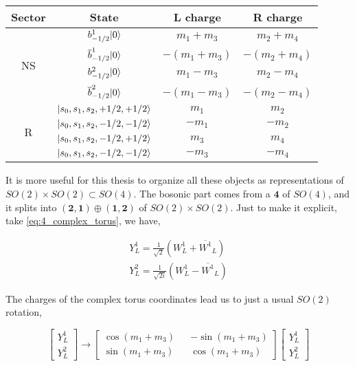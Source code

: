 \begin{table}[h]
    \centering
    \begin{tabular}{cccc}
    Sector              & State                          & L charge     & R charge     \\ \hline
    \multirow{4}{*}{NS} & $b_{-1/2}^1\lvert0\rangle$            & $m_1+m_3$    & $m_2+m_4$    \\
                        & $\overline{b}_{-1/2}^1\lvert0\rangle$ & $-(m_1+m_3)$ & $-(m_2+m_4)$ \\
                        & $b_{-1/2}^2\lvert0\rangle$            & $m_1-m_3$    & $m_2-m_4$    \\
                        & $\overline{b}_{-1/2}^2\lvert0\rangle$ & $-(m_1-m_3)$ & $-(m_2-m_4)$ \\ \hline
    \multirow{4}{*}{R}  & $\lvert s_0,s_1,s_2,+1/2,+1/2\rangle$  & $m_1$        & $m_2$        \\
                        & $\lvert s_0,s_1,s_2,-1/2,-1/2\rangle$  & $-m_1$       & $-m_2$       \\
                        & $\lvert s_0,s_1,s_2,-1/2,+1/2\rangle$  & $m_3$        & $m_4$        \\
                        & $\lvert s_0,s_1,s_2,-1/2,-1/2\rangle$  & $-m_3$       & $-m_4$      
\end{tabular}
\end{table}

It is more useful for this thesis to organize all these objects as representations of $SO(2)\times SO(2) \subset SO(4)$. The bosonic part comes from a $\mathbf{4}$ of $SO(4)$, and it splits into $(\mathbf{2},\mathbf{1}) \oplus (\mathbf{1},\mathbf{2})$ of $SO(2)\times SO(2)$. Just to make it explicit, take \ref{eq:4_complex_torus}, we have,

\begin{align}
    Y^1_L = \frac{1}{\sqrt{2}} (W^1_L + \overline{W^1}_L) \\
    Y^2_L = \frac{1}{\sqrt{2i}} (W^1_L - \overline{W^1}_L) 
\end{align}

The charges of the complex torus coordinates lead us to just a usual $SO(2)$ rotation,

\begin{equation}
    \begin{bmatrix}Y_L^1\\Y_L^2\end{bmatrix}\to\begin{bmatrix}\cos{(m_1+m_3)}&&-\sin{(m_1+m_3)}\\\sin{(m_1+m_3)}&&\cos{(m_1+m_3)}\end{bmatrix}\begin{bmatrix}Y_L^1\\Y_L^2\end{bmatrix}
\end{equation}

